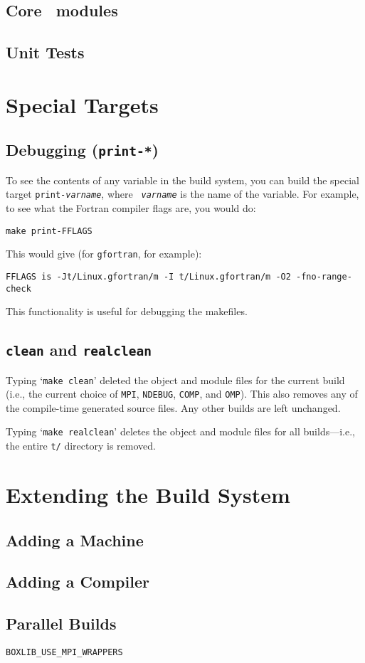 \subsection{Core \maestro\ modules}

\subsection{Unit Tests}


\section{Special Targets}

\subsection{Debugging ({\tt print-*})}

To see the contents of any variable in the build system, you can build
the special target {\tt print-{\em varname}}, where {\tt {\em
varname}} is the name of the variable.  For example, to see what the
Fortran compiler flags are, you would do:
\begin{verbatim}
make print-FFLAGS
\end{verbatim}
This would give (for {\tt gfortran}, for example):
\begin{verbatim}
FFLAGS is -Jt/Linux.gfortran/m -I t/Linux.gfortran/m -O2 -fno-range-check
\end{verbatim}
This functionality is useful for debugging the makefiles.

\subsection{{\tt clean} and {\tt realclean}}

Typing `{\tt make clean}' deleted the object and module files for the
current build (i.e., the current choice of {\tt MPI}, {\tt NDEBUG},
{\tt COMP}, and {\tt OMP}).  This also removes any of the compile-time
generated source files.  Any other builds are left unchanged.

Typing `{\tt make realclean}' deletes the object and module files for
all builds---i.e., the entire {\tt t/} directory is removed.

\section{Extending the Build System}

\subsection{Adding a Machine}

\subsection{Adding a Compiler}

\subsection{Parallel Builds}

{\tt BOXLIB\_USE\_MPI\_WRAPPERS}



